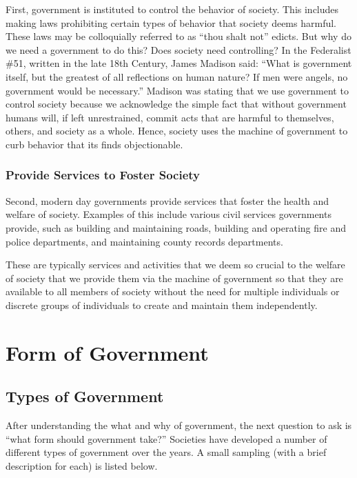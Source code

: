 First, government is instituted to control the behavior of society.  This includes making laws prohibiting certain types of behavior that society deems harmful.  These laws may be colloquially referred to as ``thou shalt not'' edicts.  But why do we need a government to do this?  Does society need controlling?  In the Federalist \#51, written in the late 18th Century, James Madison said: ``What is government itself, but the greatest of all reflections on human nature? If men were angels, no government would be necessary.''  Madison was stating that we use government to control society because we acknowledge the simple fact that without government humans will, if left unrestrained, commit acts that are harmful to themselves, others, and society as a whole.  Hence, society uses the machine of government to curb behavior that its finds objectionable.

\subsubsection{Provide Services to Foster Society}

Second, modern day governments provide services that foster the health and welfare of society.  Examples of this include various civil services governments provide, such as building and maintaining roads, building and operating fire and police departments, and maintaining county records departments.

These are typically services and activities that we deem so crucial to the welfare of society that we provide them via the machine of government so that they are available to all members of society without the need for multiple individuals or discrete groups of individuals to create and maintain them independently.

\section{Form of Government}

\subsection {Types of Government}
After understanding the what and why of government, the next question to ask is ``what form should government take?''  Societies have developed a number of different types of government over the years.  A small sampling (with a brief description for each) is listed below.

